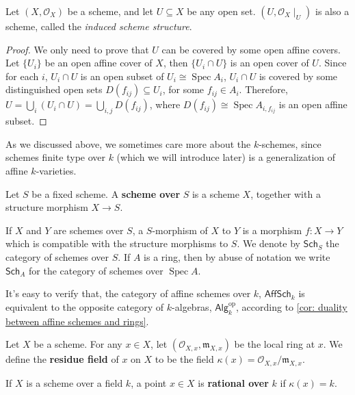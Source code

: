 \documentclass[11pt]{article}
\newcommand{\Spec}{\operatorname{Spec}}
\begin{document}
\begin{lemma}
    \cite[Exercise II.2.2]{hartsAG}
    Let $ (X,\mathscr{O}_{X}) $ be a scheme, and let $ U \subseteq X $ be any open set.  
    $ (U,\mathscr{O}_{X}\mid_{U}) $ is also a scheme, called the \emph{induced scheme structure}. 
    
\end{lemma}

\begin{proof}
    We only need to prove that $ U $ can be covered by some open affine covers. 
    Let $ \{U_{i}\} $ be an open affine cover of $ X $, then $ \{U_{i} \cap U \}$ is an open cover of $ U $. 
    Since for each $ i $, $ U_{i} \cap U $ is an open subset of $ U_{i} \cong \Spec A_{i} $, 
    $ U_{i} \cap U $ is covered by some distinguished open sets $ D(f_{ij}) \subseteq U_{i} $, for some $ f_{ij} \in A_{i} $.  
    Therefore, $ U = \bigcup_{i} (U_{i} \cap U) = \bigcup_{i,j} D(f_{ij}) $, where $ D(f_{ij}) \cong \Spec A_{i,f_{ij}} $ 
    is an open affine subset. 
\end{proof}


As we discussed above, we sometimes care more about the $ k $-schemes, since schemes finite type over $ k $ 
(which we will introduce later) is a generalization of affine $ k $-varieties. 

\begin{definition}
    Let $ S $ be a fixed scheme. A \textbf{scheme over} $ S $ is a scheme $ X $, together with a structure morphism 
    $ X \to S $. 
    
    If $ X $ and $ Y $ are schemes over $ S $, a $ S $-morphism of $ X $ to $ Y $ is a morphism 
    $ f: X\to Y $ which is compatible with the structure morphisms to $ S $. 
    We denote by $ \mathsf{Sch}_{S} $ the category of schemes over $ S $. If $ A $ is a ring, 
    then by abuse of notation we write $ \mathsf{Sch}_{A} $ for the category of schemes over $ \Spec A $. 
\end{definition}

It's easy to verify that, the category of affine schemes over $ k $, $ \mathsf{AffSch}_{k} $ is 
equivalent to the opposite category of $ k $-algebras, $ \mathsf{Alg}_{k}^{\operatorname{op}}$, 
according to \autoref{cor: duality between affine schemes and rings}. 



\begin{definition}
    Let $ X $ be a scheme. For any $ x \in X $, let $ (\mathscr{O}_{X,x},\mathfrak{m}_{X,x}) $ be the local ring at $ x $. 
    We define the \textbf{residue field} of $ x $ on $ X $ to be the field $ \kappa(x) = \mathscr{O}_{X,x} / \mathfrak{m}_{X,x} $. 

    If $ X $ is a scheme over a field $ k $, a point $ x \in X $ is \textbf{rational over }$ k $ if 
    $ \kappa(x)=k $. 
\end{definition}
\end{document}
